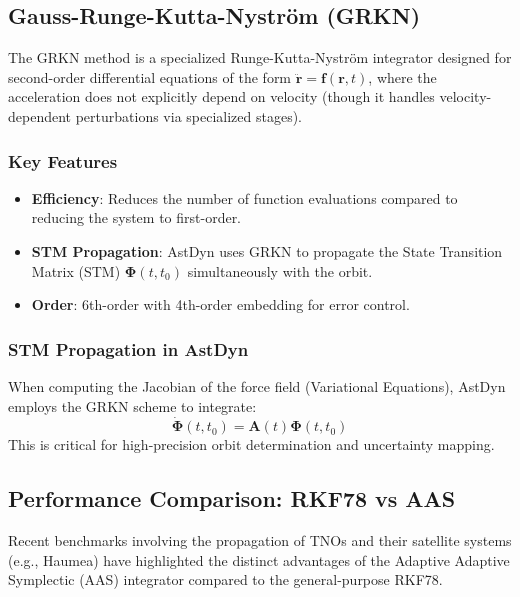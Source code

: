 \subsection{Gauss-Runge-Kutta-Nystr\"om (GRKN)}
\label{subsec:grkn_integrator}

The GRKN method is a specialized Runge-Kutta-Nystr\"om integrator designed for second-order differential equations of the form $\ddot{\mathbf{r}} = \mathbf{f}(\mathbf{r}, t)$, where the acceleration does not explicitly depend on velocity (though it handles velocity-dependent perturbations via specialized stages).

\subsubsection{Key Features}

\begin{itemize}
    \item \textbf{Efficiency}: Reduces the number of function evaluations compared to reducing the system to first-order.
    \item \textbf{STM Propagation}: AstDyn uses GRKN to propagate the State Transition Matrix (STM) $\mathbf{\Phi}(t, t_0)$ simultaneously with the orbit.
    \item \textbf{Order}: 6th-order with 4th-order embedding for error control.
\end{itemize}

\subsubsection{STM Propagation in AstDyn}

When computing the Jacobian of the force field (Variational Equations), AstDyn employs the GRKN scheme to integrate:
\begin{equation}
    \dot{\mathbf{\Phi}}(t, t_0) = \mathbf{A}(t) \mathbf{\Phi}(t, t_0)
\end{equation}
This is critical for high-precision orbit determination and uncertainty mapping.

\subsection{Performance Comparison: RKF78 vs AAS}
\label{subsec:rkf78_vs_aas}

Recent benchmarks involving the propagation of TNOs and their satellite systems (e.g., Haumea) have highlighted the distinct advantages of the Adaptive Adaptive Symplectic (AAS) integrator compared to the general-purpose RKF78.


